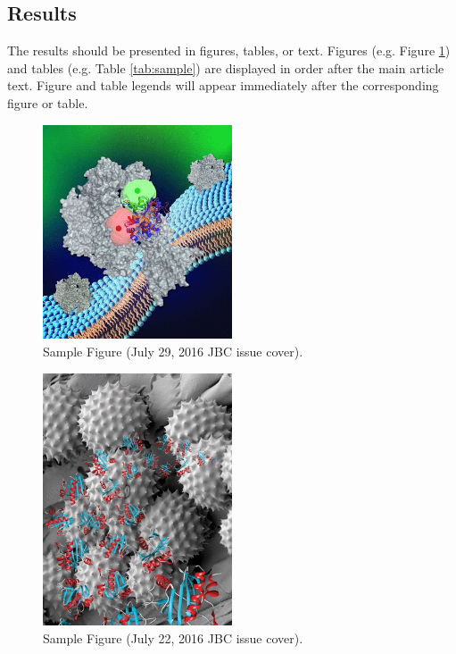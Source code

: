 \documentclass{jbc-article}
\begin{document}
\begin{article}
\section{Results}

The results should be presented in figures, tables, or text. Figures (e.g. Figure \ref{fig:july29cover}) and tables (e.g. Table \ref{tab:sample}) are displayed in order after the main article text. Figure and table legends will appear immediately after the corresponding figure or table.

\begin{figure}[hbtp!]\centering
\includegraphics[width=0.5\textwidth]{figures/jbc-cover-20160729.jpg}
\caption{Sample Figure (July 29, 2016 JBC issue cover).}
\label{fig:july29cover}
\end{figure}

\begin{figure}[hbtp!]\centering
\includegraphics[width=0.5\textwidth]{figures/jbc-cover-20160722.jpg}
\caption{Sample Figure (July 22, 2016 JBC issue cover).}
\label{fig:july22cover}
\end{figure}


\end{article}
\end{document}
